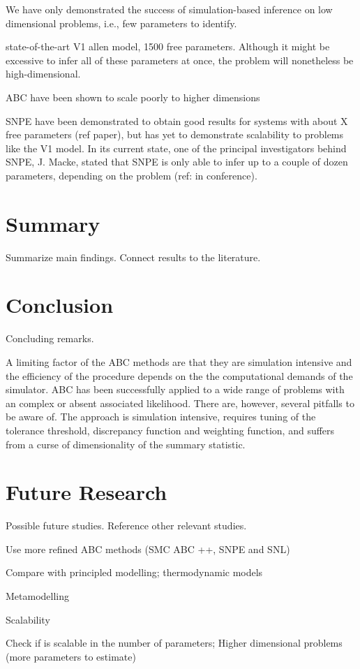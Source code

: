 We have only demonstrated the success of simulation-based inference on low dimensional problems, i.e., few parameters to identify. 

state-of-the-art V1 allen model, 1500 free parameters. Although it might be excessive to infer all of these parameters at once, the problem will nonetheless be high-dimensional. 

ABC have been shown to scale poorly to higher dimensions

SNPE have been demonstrated to obtain good results for systems with about X free parameters (ref paper), but has yet to demonstrate scalability to problems like the V1 model. In its current state, one of the principal investigators behind SNPE, J. Macke, stated that SNPE is only able to infer up to a couple of dozen parameters, depending on the problem (ref: in conference).


\section{Summary}\label{sec:summary}

Summarize main findings. Connect results to the literature. 

\section{Conclusion}\label{sec:conclusion}

Concluding remarks.

A limiting factor of the ABC methods are that they are simulation intensive and the efficiency of the procedure depends on the the computational demands of the simulator.  
ABC has been successfully applied to a wide range of problems with an complex or absent associated likelihood. There are, however, several pitfalls to be aware of. The approach is simulation intensive, requires tuning of the tolerance threshold, discrepancy function and weighting function, and suffers from a curse of dimensionality of the summary statistic.  

\section{Future Research}\label{sec:future}

Possible future studies. Reference other relevant studies. 

Use more refined ABC methods
(SMC ABC ++, SNPE and SNL)

Compare with principled modelling; thermodynamic models

Metamodelling

Scalability 

Check if is scalable in the number of parameters;
Higher dimensional problems (more parameters to estimate)

